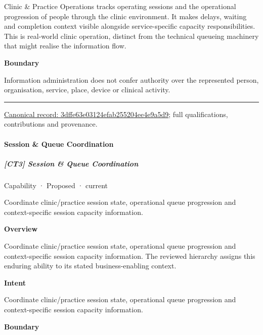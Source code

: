 Clinic \& Practice Operations tracks operating sessions and the operational progression of people through the clinic environment. It makes delays, waiting and completion context visible alongside service-specific capacity responsibilities. This is real-world clinic operation, distinct from the technical queueing machinery that might realise the information flow.



\textbf{Boundary}



Information administration does not confer authority over the represented person, organisation, service, place, device or clinical activity.



\medskip\hrule\medskip

{\footnotesize \href{../../../../continuum/strategy/capability/3dffe63e03124efab255204ee4e9a5d9.md}{Canonical record: 3dffe63e03124efab255204ee4e9a5d9}; full qualifications, contributions and provenance.}\par
\paragraph{Session \& Queue Coordination}

\subparagraph{[CT3] Session \& Queue Coordination}

\label{element:22981a95ca6e466582363706fde8fceb}
{\small Capability · Proposed · current}\par

Coordinate clinic/practice session state, operational queue progression and context-specific session capacity information.



\textbf{Overview}



Coordinate clinic/practice session state, operational queue progression and context-specific session capacity information. The reviewed hierarchy assigns this enduring ability to its stated business-enabling context.



\textbf{Intent}



Coordinate clinic/practice session state, operational queue progression and context-specific session capacity information.



\textbf{Boundary}



